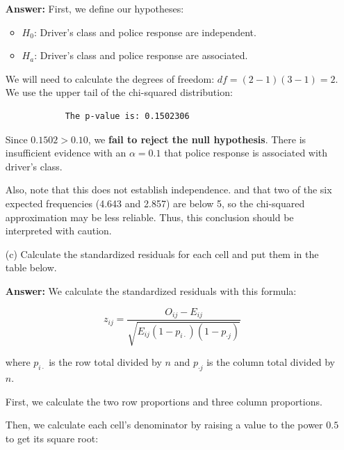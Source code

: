 \documentclass[12pt,letterpaper]{article}
\begin{document}
\begin{enumerate}
		\vspace{.25cm}
		\textbf{Answer:} First, we define our hypotheses:
		
		\begin{itemize}
			\item $H_0$: Driver's class and police response are independent.
			\item $H_a$: Driver's class and police response are associated.
		\end{itemize}
		
		We will need to calculate the degrees of freedom: $df=(2-1)(3-1)=2$. We use the upper tail of the chi-squared distribution:
		
		
		
		\begin{verbatim}
			The p-value is: 0.1502306
		\end{verbatim}
		
		Since $0.1502>0.10$, we \textbf{fail to reject the null hypothesis}.
		There is insufficient evidence with an $\alpha=0.1$ that police response is
		associated with driver's class. 
		
		Also, note that this does not establish independence. and that two of the six expected frequencies (4.643 and 2.857) are below 5, so the chi-squared approximation may be less reliable. Thus, this conclusion should be interpreted with caution.
		
		\newpage
		\item [(c)] Calculate the standardized residuals for each cell and put them in the table below.
		
		\vspace{.25cm}
		\textbf{Answer:} We calculate the standardized residuals with this formula:
		
		$$z_{ij}=\frac{O_{ij}-E_{ij}}{\sqrt{E_{ij}(1-p_{i\cdot})(1-p_{\cdot j})}}$$
		
		where $p_{i\cdot}$ is the row total divided by $n$ and $p_{\cdot j}$ is
		the column total divided by $n$.
		
		\vspace{.25cm}
		
		First, we calculate the two row proportions and three column proportions.
		
		
		
		Then, we calculate each cell's denominator by raising a value to
		the power $0.5$ to get its square root:
		

\end{enumerate}
\end{document}
